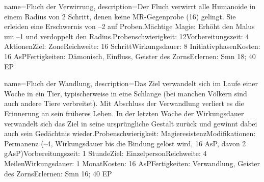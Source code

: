 {
    name={Fluch der Verwirrung},
    description={Der Fluch verwirrt alle Humanoide in einem Radius von 2 Schritt, denen keine MR-Gegenprobe (16) gelingt. Sie erleiden eine Erschwernis von –2 auf Proben.\newline Mächtige Magie: Erhöht den Malus um –1 und verdoppelt den Radius.\newline Probenschwierigkeit: 12\newline Vorbereitungszeit: 4 Aktionen\newline Ziel: Zone\newline Reichweite: 16 Schritt\newline Wirkungsdauer: 8 Initiativphasen\newline Kosten: 16 AsP\newline Fertigkeiten: Dämonisch, Einfluss, Geister des Zorns\newline Erlernen: Smn 18; 40 EP}
}


{
    name={Fluch der Wandlung},
    description={Das Ziel verwandelt sich im Laufe einer Woche in ein Tier, typischerweise in eine Schlange (bei manchen Völkern sind auch andere Tiere verbreitet). Mit Abschluss der Verwandlung verliert es die Erinnerung an sein früheres Leben. In der letzten Woche der Wirkungsdauer verwandelt sich das Ziel in seine ursprüngliche Gestalt zurück und gewinnt dabei auch sein Gedächtnis wieder.\newline Probenschwierigkeit: Magieresistenz\newline Modifikationen: Permanenz (–4, Wirkungsdauer bis die Bindung gelöst wird, 16 AsP, davon 2 gAsP)\newline Vorbereitungszeit: 1 Stunde\newline Ziel: Einzelperson\newline Reichweite: 4 Meilen\newline Wirkungsdauer: 1 Monat\newline Kosten: 16 AsP\newline Fertigkeiten: Verwandlung, Geister des Zorns\newline Erlernen: Smn 16; 40 EP}
}



